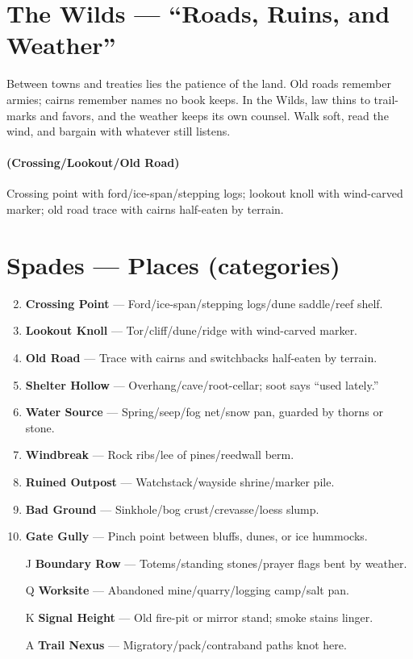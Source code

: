 \section{The Wilds --- ``Roads, Ruins, and Weather''}
\label{chap:wilderness}

\begin{tcolorbox}[colback=black!3,colframe=black!40!white,title={Theme \& Atmosphere}]
Between towns and treaties lies the patience of the land. Old roads remember armies; cairns remember names no book keeps. In the Wilds, law thins to trail-marks and favors, and the weather keeps its own counsel. Walk soft, read the wind, and bargain with whatever still listens.
\end{tcolorbox}

\paragraph*{(Crossing/Lookout/Old Road)} Crossing point with ford/ice-span/stepping logs; lookout knoll with wind-carved marker; old road trace with cairns half-eaten by terrain.

\section*{Spades --- Places (categories)}
\label{sec:wilderness-places}
\begin{enumerate}
\setcounter{enumi}{1}
\item \textbf{Crossing Point} --- Ford/ice-span/stepping logs/dune saddle/reef shelf.
\item \textbf{Lookout Knoll} --- Tor/cliff/dune/ridge with wind-carved marker.
\item \textbf{Old Road} --- Trace with cairns and switchbacks half-eaten by terrain.
\item \textbf{Shelter Hollow} --- Overhang/cave/root-cellar; soot says ``used lately.''
\item \textbf{Water Source} --- Spring/seep/fog net/snow pan, guarded by thorns or stone.
\item \textbf{Windbreak} --- Rock ribs/lee of pines/reedwall berm.
\item \textbf{Ruined Outpost} --- Watchstack/wayside shrine/marker pile.
\item \textbf{Bad Ground} --- Sinkhole/bog crust/crevasse/loess slump.
\item \textbf{Gate Gully} --- Pinch point between bluffs, dunes, or ice hummocks.
\item[J] \textbf{Boundary Row} --- Totems/standing stones/prayer flags bent by weather.
\item[Q] \textbf{Worksite} --- Abandoned mine/quarry/logging camp/salt pan.
\item[K] \textbf{Signal Height} --- Old fire-pit or mirror stand; smoke stains linger.
\item[A] \textbf{Trail Nexus} --- Migratory/pack/contraband paths knot here.
\end{enumerate}

